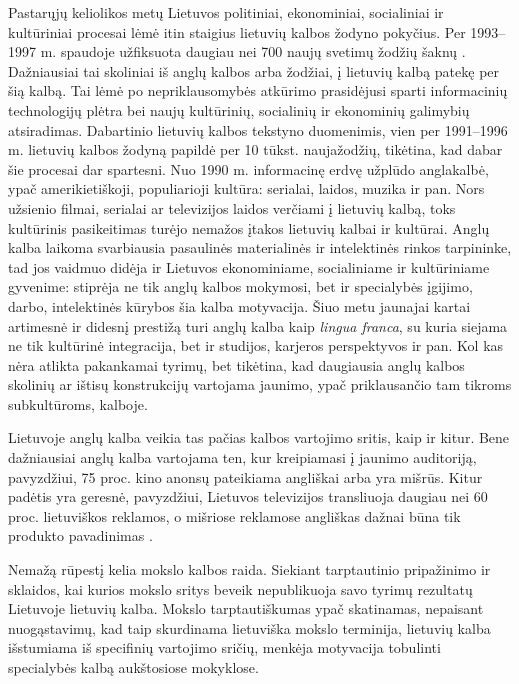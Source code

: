\begin{multicols}{2}
Pastarųjų keliolikos metų Lietuvos politiniai, ekonominiai, socialiniai ir kultūriniai procesai lėmė itin staigius lietuvių kalbos žodyno pokyčius. Per 1993–1997 m. spaudoje užfiksuota daugiau nei 700 naujų svetimų žodžių šaknų \cite{nbi1}. Dažniausiai tai skoliniai iš anglų kalbos arba žodžiai, į lietuvių kalbą patekę per šią kalbą. Tai lėmė po nepriklausomybės atkūrimo prasidėjusi sparti informacinių technologijų plėtra bei naujų kultūrinių, socialinių ir ekonominių galimybių atsiradimas. Dabartinio lietuvių kalbos tekstyno duomenimis, vien per 1991–1996 m. lietuvių kalbos žodyną papildė per 10 tūkst. naujažodžių, tikėtina, kad dabar šie procesai dar spartesni.
Nuo 1990 m. informacinę erdvę užplūdo anglakalbė, ypač amerikietiškoji, populiarioji kultūra: serialai, laidos, muzika ir pan. Nors užsienio filmai, serialai ar televizijos laidos verčiami į lietuvių kalbą, toks kultūrinis pasikeitimas turėjo nemažos įtakos lietuvių kalbai ir kultūrai. Anglų kalba laikoma svarbiausia pasaulinės materialinės ir intelektinės rinkos tarpininke, tad jos vaidmuo didėja ir Lietuvos ekonominiame, socialiniame ir kultūriniame gyvenime: stiprėja ne tik anglų kalbos mokymosi, bet ir specialybės įgijimo, darbo, intelektinės kūrybos šia kalba motyvacija. Šiuo metu jaunajai kartai artimesnė ir didesnį prestižą turi anglų kalba kaip \textit{lingua franca}, su kuria siejama ne tik kultūrinė integracija, bet ir studijos, karjeros perspektyvos ir pan. Kol kas nėra atlikta pakankamai tyrimų, bet tikėtina, kad daugiausia anglų kalbos skolinių ar ištisų konstrukcijų vartojama jaunimo, ypač priklausančio tam tikroms subkultūroms, kalboje.

Lietuvoje anglų kalba veikia tas pačias kalbos vartojimo sritis, kaip ir kitur. Bene dažniausiai anglų kalba vartojama ten, kur kreipiamasi į jaunimo auditoriją, pavyzdžiui, 75 proc. kino anonsų pateikiama angliškai arba yra mišrūs. Kitur padėtis yra geresnė, pavyzdžiui, Lietuvos televizijos transliuoja daugiau nei 60 proc. lietuviškos reklamos, o mišriose reklamose angliškas dažnai būna tik produkto pavadinimas \cite{nbi1}.

Nemažą rūpestį kelia mokslo kalbos raida. Siekiant tarptautinio pripažinimo ir sklaidos, kai kurios mokslo sritys beveik nepublikuoja savo tyrimų rezultatų Lietuvoje lietuvių kalba. Mokslo tarptautiškumas ypač skatinamas, nepaisant nuogąstavimų, kad taip skurdinama lietuviška mokslo terminija, lietuvių kalba išstumiama iš specifinių vartojimo sričių, menkėja motyvacija tobulinti specialybės kalbą aukštosiose mokyklose.


\end{multicols}
